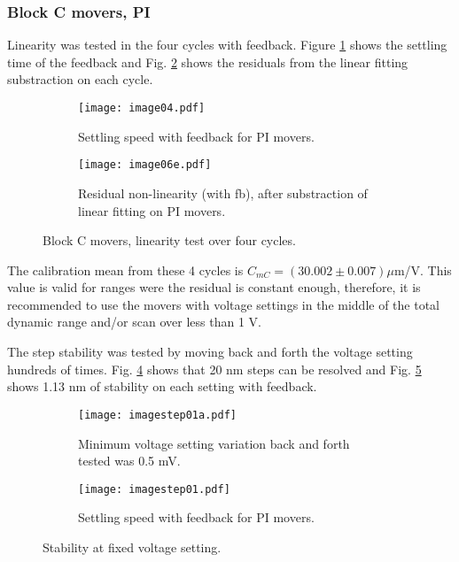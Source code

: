 \subsubsection{Block C movers, PI}
Linearity was tested in the four cycles with feedback. Figure \ref{f:PImsteps} shows the settling time of the feedback and Fig. \ref{f:PIlinres} shows the residuals from the linear fitting substraction on each cycle.\par
\begin{figure}[!htb]
 \centering\hspace*{-0.6cm}
\begin{subfigure}{0.4\textwidth}
 \texttt{[image: image04.pdf]}\caption{Settling speed with feedback for PI movers.}\label{f:PImsteps}
\end{subfigure}\hspace*{1.5cm}
\begin{subfigure}{0.4\textwidth}
 \texttt{[image: image06e.pdf]}\caption{Residual non-linearity (with fb), after substraction of linear fitting on PI movers.}\label{f:PIlinres}
\end{subfigure}\caption{Block C movers, linearity test over four cycles.}\label{f:PIfeedback}
\end{figure}
The calibration mean from these 4 cycles is $C_{mC} = (30.002\pm0.007)\mu$m/V. This value is valid for ranges were the residual is constant enough, therefore, it is recommended to use the movers with voltage settings in the middle of the total dynamic range and/or scan over less than 1 V.\par
The step stability was tested by moving back and forth the voltage setting hundreds of times. Fig. \ref{f:PIstepstab} shows that 20 nm steps can be resolved and Fig. \ref{f:PIstab} shows 1.13 nm of stability on each setting with feedback.\par
\begin{figure}[!htb]
 \centering\hspace*{-0.6cm}
\begin{subfigure}{0.4\textwidth}
\texttt{[image: imagestep01a.pdf]}\caption{Minimum voltage setting variation back and forth tested was 0.5 mV.}\label{f:PIstepstab}
\end{subfigure}\hspace*{1.5cm}
\begin{subfigure}{0.4\textwidth}
 \texttt{[image: imagestep01.pdf]}\caption{Settling speed with feedback for PI movers.}\label{f:PIstab}
\end{subfigure}\caption{Stability at fixed voltage setting.}\label{f:PIstability}
\end{figure}
